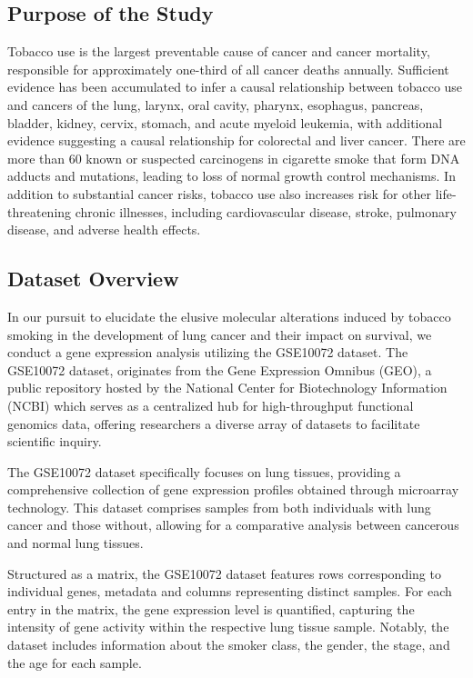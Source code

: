 \documentclass[
	a4paper, %
	10pt, %
	unnumberedsections, %
	twoside, %
]{LTJournalArticle}
\begin{document}
\subsection{Purpose of the Study}
Tobacco use is the largest preventable cause of cancer and cancer mortality, responsible for approximately one-third of all cancer deaths annually. Sufficient evidence has been accumulated to infer a causal relationship between tobacco use and cancers of the lung, larynx, oral cavity, pharynx, esophagus, pancreas, bladder, kidney, cervix, stomach, and acute myeloid leukemia, with additional evidence suggesting a causal relationship for colorectal and liver cancer. There are more than 60 known or suspected carcinogens in cigarette smoke that form DNA adducts and mutations, leading to loss of normal growth control mechanisms. In addition to substantial cancer risks, tobacco use also increases risk for other life-threatening chronic illnesses, including cardiovascular disease, stroke, pulmonary disease, and adverse health effects.


\subsection{Dataset Overview}
In our pursuit to elucidate the elusive molecular alterations induced by tobacco smoking in the development of lung cancer and their impact on survival, we conduct a gene expression analysis utilizing the GSE10072 dataset. The GSE10072 dataset, originates from the Gene Expression Omnibus (GEO), a public repository hosted by the National Center for Biotechnology Information (NCBI) which serves as a centralized hub for high-throughput functional genomics data, offering researchers a diverse array of datasets to facilitate scientific inquiry. 

The GSE10072 dataset specifically focuses on lung tissues, providing a comprehensive collection of gene expression profiles obtained through microarray technology. This dataset comprises samples from both individuals with lung cancer and those without, allowing for a comparative analysis between cancerous and normal lung tissues. 

Structured as a matrix, the GSE10072 dataset features rows corresponding to individual genes, metadata and columns representing distinct samples. For each entry in the matrix, the gene expression level is quantified, capturing the intensity of gene activity within the respective lung tissue sample. Notably, the dataset includes information about the smoker class, the gender, the stage, and the age for each sample.
\end{document}
